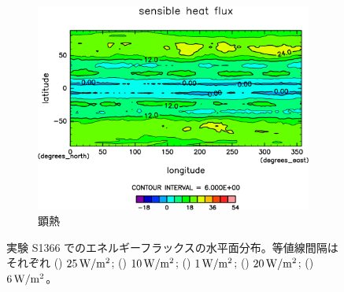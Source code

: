 \documentclass[body]{subfiles}
\begin{document}
\begin{figure}[t]
\begin{subfigure}{.4\textwidth}
		\includegraphics[width=\columnwidth]{S1366/Sens,time=14600:14965-crop-rotate.pdf}
		\caption{顕熱\hmu*{[W/m^{-2}]}}\label{S1366顕熱}
	\end{subfigure}
	\caption[実験 S1366 のエネルギーフラックスの水平分布]{
		実験 S1366 でのエネルギーフラックスの水平面分布。等値線間隔はそれぞれ
		() \(25\hmu{W/m^2}\);
		() \(10\hmu{W/m^2}\);
		() \(1\hmu{W/m^2}\);
		() \(20\hmu{W/m^2}\);
		() \(6\hmu{W/m^2}\)。
	}\label{S1366_heat}
\end{figure}
\end{document}
